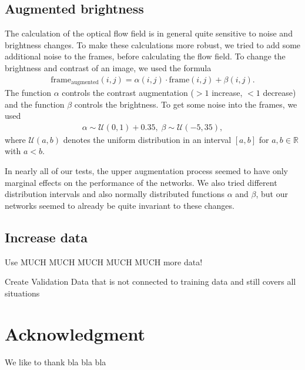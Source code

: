 \documentclass[conference]{IEEEtran}
\begin{document}
\subsection{Augmented brightness}
The calculation of the optical flow field is in general quite sensitive to noise and brightness changes. To make these calculations more robust, we
tried to add some additional noise to the frames, before calculating the flow field. To change the brightness and contrast of an image, we used
the formula
\begin{align*}
\mathrm{frame}_{\mathrm{augmented}}(i,j) = \alpha(i,j) \cdot \mathrm{frame}(i,j) + \beta(i,j).
\end{align*}
The function $\alpha$ controls the contrast augmentation ($>1$ increase, $<1$ decrease) and the function $\beta$ controls the brightness. To 
get some noise into the frames, we used
\begin{align*}
\alpha \sim \mathcal{U}(0,1)+0.35,\; \beta \sim \mathcal{U}(-5,35),
\end{align*}
where $\mathcal{U}(a,b)$ denotes the uniform distribution in an interval $[a,b]$ for $a,b\in \mathbb{R}$ with $a < b$. 

In nearly all of our tests, the upper augmentation process seemed to have only marginal effects on the performance of the networks. We 
also tried different distribution intervals and also normally distributed functions $\alpha$ and $\beta$, but
our networks seemed to already be quite invariant to these changes.
\subsection{Increase data}

Use MUCH MUCH MUCH MUCH MUCH more data!

Create Validation Data that is not connected to training data and still covers all situations


\section*{Acknowledgment}
We like to thank bla bla bla




\printbibliography
\end{document}
